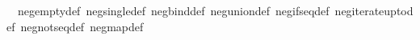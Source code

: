 \begin{isabellebody}
\ \ neg{\isacharunderscore}{\kern0pt}empty{\isacharunderscore}{\kern0pt}def\ neg{\isacharunderscore}{\kern0pt}single{\isacharunderscore}{\kern0pt}def\ neg{\isacharunderscore}{\kern0pt}bind{\isacharunderscore}{\kern0pt}def\ neg{\isacharunderscore}{\kern0pt}union{\isacharunderscore}{\kern0pt}def\ neg{\isacharunderscore}{\kern0pt}if{\isacharunderscore}{\kern0pt}seq{\isacharunderscore}{\kern0pt}def\ neg{\isacharunderscore}{\kern0pt}iterate{\isacharunderscore}{\kern0pt}upto{\isacharunderscore}{\kern0pt}def\ neg{\isacharunderscore}{\kern0pt}not{\isacharunderscore}{\kern0pt}seq{\isacharunderscore}{\kern0pt}def\ neg{\isacharunderscore}{\kern0pt}map{\isacharunderscore}{\kern0pt}def\isanewline
%
\isadelimtheory
\isanewline
%
\endisadelimtheory
%
\isatagtheory
{}\isamarkupfalse%
%
\endisatagtheory
{\isafoldtheory}%
%
\isadelimtheory
%
\endisadelimtheory
%
\end{isabellebody}%
\endinput
